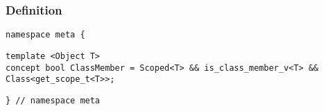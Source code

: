 
\subsubsection{Definition}

\begin{verbatim}
namespace meta {
\end{verbatim}
\begin{verbatim}
template <Object T>
concept bool ClassMember = Scoped<T> && is_class_member_v<T> && Class<get_scope_t<T>>;

\end{verbatim}
\begin{verbatim}
} // namespace meta
\end{verbatim}
